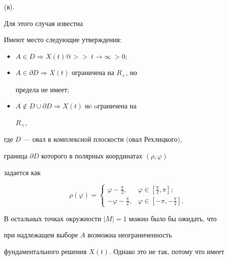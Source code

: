 (в). 


 


Для этого случая известна 


 


\begin{thmnonum} 


Имеют место следующие утверждения${:}$ 


\begin{itemize} 


\item[1.] $A\in D\Rightarrow X(t)@>>{\ t\to\infty\ }>0;$ 


\item[2.] $A\in\partial D\Rightarrow X(t)$ ограничена на $R_+$, но 


предела не имеет$;$ 


\item[3.] $A\notin D\cup\partial D\Rightarrow X(t)$ нe oграничена на 


$R_+$, 


\end{itemize} 


\noindent{}где $D$ --- овал в комплексной плоскости $($овал Рехлицкого$)$, 


граница $\partial D$ которого в полярных координатах $(\rho,\varphi)$ 


задается как 


$$ 


\rho(\varphi)= 


\begin{cases} 


\varphi-\frac{\pi}{2}, & \varphi\in[\frac{\pi}{2},\pi]; \\ 


-\varphi-\frac{\pi}{2}, & \varphi\in[-\pi,-\frac{\pi}{2}]. 


\end{cases} 


$$ 


\end{thmnonum} 


 


В остальных точках окружности $|M|=1$ можно было бы ожидать, что 


при надлежащем выборе $A$ возможна неограниченность 


фундаментального решения $X(t)$. Однако это не так, потому что имеет 


